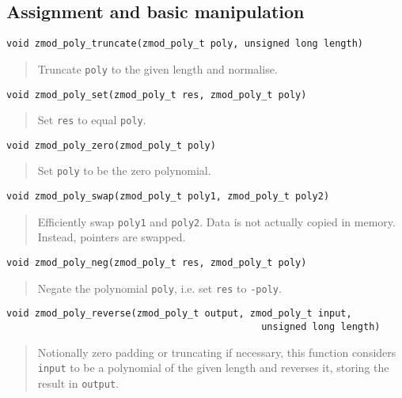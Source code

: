 \documentclass[a4paper,10pt]{article}
\newcommand{\code}{\lstinline}
\begin{document}
\subsection{Assignment and basic manipulation}
\begin{lstlisting}
void zmod_poly_truncate(zmod_poly_t poly, unsigned long length)
\end{lstlisting}
\begin{quote}
Truncate \code{poly} to the given length and normalise.
\end{quote}

\begin{lstlisting}
void zmod_poly_set(zmod_poly_t res, zmod_poly_t poly)
\end{lstlisting}
\begin{quote}
Set \code{res} to equal \code{poly}.
\end{quote}

\begin{lstlisting}
void zmod_poly_zero(zmod_poly_t poly)
\end{lstlisting}
\begin{quote}
Set \code{poly} to be the zero polynomial.
\end{quote}

\begin{lstlisting}
void zmod_poly_swap(zmod_poly_t poly1, zmod_poly_t poly2)
\end{lstlisting}
\begin{quote}
Efficiently swap \code{poly1} and \code{poly2}. Data is not actually copied in memory. Instead, pointers are swapped.
\end{quote}

\begin{lstlisting}
void zmod_poly_neg(zmod_poly_t res, zmod_poly_t poly)
\end{lstlisting}
\begin{quote}
Negate the polynomial \code{poly}, i.e. set \code{res} to \code{-poly}.
\end{quote}

\begin{lstlisting}
void zmod_poly_reverse(zmod_poly_t output, zmod_poly_t input,
                                             unsigned long length)
\end{lstlisting}
\begin{quote}
Notionally zero padding or truncating if necessary, this function considers \code{input} to be a polynomial of the given length and reverses it, storing the result in \code{output}.
\end{quote}
\end{document}
